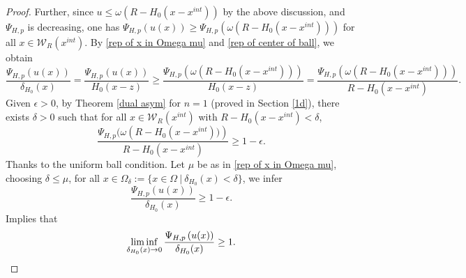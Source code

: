 \documentclass[11pt]{amsart}
\numberwithin{equation}{section}
\begin{document}
\begin{proof}
    Further, since $u\leq \omega(R-H_{0}(x-x^{int}))$ by the above discussion, and $\Psi_{H,p}$ is decreasing, one has $\Psi_{H,p}(u(x))\geq \Psi_{H,p}(\omega(R-H_{0}(x-x^{int})))$ for all $x\in \mathcal{W}_{R}(x^{int})$. By \eqref{rep of x in Omega mu} and \eqref{rep of center of ball}, we obtain
       \begin{equation*}
           \frac{\Psi_{H,p}\left(u(x)\right)}{\delta_{H_{0}}(x)}=\frac{\Psi_{H,p}\left(u(x)\right)}{H_{0}(x-z)}\geq \frac{\Psi_{H,p}\left(\omega\left(R-H_{0}(x-x^{int})\right)\right)}{H_{0}(x-z)}
           = \frac{\Psi_{H,p}\left(\omega\left(R-H_{0}(x-x^{int})\right)\right)}{R-H_{0}(x-x^{int})}.
            \end{equation*}
      Given $\epsilon>0$, by Theorem \ref{dual asym} for $n=1$ (proved in Section \ref{1d}), there exists $\delta>0$ such that for all $x\in \mathcal{W}_{R}(x^{int})$ with $R-H_{0}(x-x^{int})<\delta$,
      \begin{equation*}
        \frac{\Psi_{H,p}(\omega\left(R-H_{0}(x-x^{int}))\right)}{R-H_{0}(x-x^{int})}\geq 1-\epsilon . 
      \end{equation*}
 Thanks to the uniform ball condition. Let $\mu$ be as in \eqref{rep of x in Omega mu}, choosing $\delta\leq \mu$, for all $x\in \Omega_{\delta}:=\{x\in \Omega~|~\delta_{H_{0}}(x)<\delta\}$,  we infer 
\begin{equation*}
    \frac{\Psi_{H,p}\left(u(x)\right)}{\delta_{H_{0}}(x)}\geq 1-\epsilon.
\end{equation*}
      Implies that 
      \begin{equation*}
          \liminf_{\delta_{H_{0}}(x)\to 0} \frac{\Psi_{H,p}\left(u(x)\right)}{\delta_{H_{0}}(x)}\geq 1.\qedhere
      \end{equation*}
   \end{proof}
\end{document}
